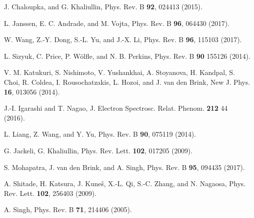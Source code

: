 \documentclass[aps,prb,fleqn,12pt,amsmath,amssymb]{revtex4}
\begin{document}
\begin{thebibliography}{99}
 J. Chaloupka, and G. Khaliullin, Phys. Rev. B {\bf 92}, 024413 (2015).

 L. Janssen, E. C. Andrade, and M. Vojta, Phys. Rev. B {\bf 96}, 064430 (2017).

 W. Wang, Z.-Y. Dong, S.-L. Yu, and J.-X. Li, Phys. Rev. B {\bf 96}, 115103 (2017).

 L. Sizyuk, C. Price, P. W\"olfle, and N. B. Perkins, Phys. Rev. B {\bf 90} 155126 (2014).

 V. M. Katukuri, S. Nishimoto, V. Yushankhai, A. Stoyanova, H. Kandpal, S. Choi, R. Coldea, I. Rousochatzakis, L. Hozoi, and J. van den Brink, New J. Phys. {\bf 16}, 013056 (2014).

 J.-I. Igarashi and T. Nagao, J. Electron Spectrosc. Relat. Phenom. {\bf 212} 44 (2016).

 L. Liang, Z. Wang, and Y. Yu, Phys. Rev. B {\bf 90}, 075119 (2014). 






 G. Jackeli, G. Khaliullin, Phys. Rev. Lett. {\bf 102}, 017205 (2009).

 S. Mohapatra, J. van den Brink, and A. Singh, Phys. Rev. B {\bf 95}, 094435 (2017).

 A. Shitade, H. Katsura, J. Kune\ifmmode {}\else \v{s}\fi{}, X.-L. Qi, S.-C. Zhang, and N. Nagaosa, Phys. Rev. Lett. {\bf 102}, 256403 (2009).

 A. Singh, Phys. Rev. B {\bf 71}, 214406 (2005).


\end{thebibliography}
\end{document}

